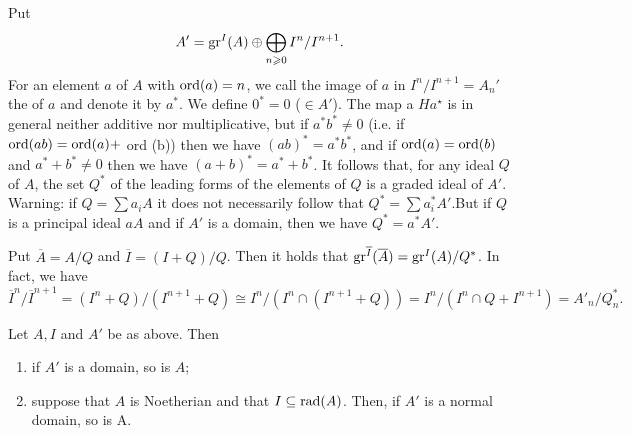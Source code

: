 \documentclass[../main]{subfiles}
\begin{document}
Put \[A'=\operatorname{gr}^I(A) \oplus \bigoplus_{n\geqslant 0} I^n/I^{n+1}.\] For an element $a$ of $A$ with $\operatorname{ord}(a)=n$, we call the image of $a$ in $I^n / I^{n+1}=A_n'$ the  of $a$ and denote it by $a^{\ast}$. We define $0^{\ast}=0$ ($\in A'$). The map a $H a^{\star}$ is in general neither additive nor multiplicative, but if $a^{\ast} b^{\ast} \neq 0$ (i.e. if $\operatorname{ord}(a b)=\operatorname{ord}(a)+$ ord (b)) then we have $(a b)^\ast=a^\ast b^\ast$, and if $\operatorname{ord}(a)=\operatorname{ord}(b)$ and $a^{\ast}+b^{\ast} \neq 0$ then we have $(a+b)^{\ast}=a^{\ast}+b^{\ast}$. It follows that, for any ideal $Q$ of $A$, the set $Q^{\ast}$ of the leading forms of the elements of $Q$ is a graded ideal of $A'$. Warning: if $Q=\sum a_iA$ it does not necessarily follow that $Q^{\ast}=\sum a_i^{\ast} A'$.But if $Q$ is a principal ideal $aA$ and if $A'$ is a domain, then we have $Q^{\ast}=a^{\ast} A'$.

Put $\overline{A} = A/Q$ and $\overline{I}= (I+Q)/Q$. Then it holds that $\operatorname{gr}^{\overline{I}}(\overline{A}) = \operatorname{gr}^I(A)/Q^\ast$. In fact, we have \[\overline{I}^n/\overline{I}^{n+1}=(I^n+Q)/(I^{n+1}+Q)\cong I^n/(I^n\cap (I^{n+1}+Q))= I^n/(I^n\cap Q+ I^{n+1}) = A'_n/Q^\ast_n.\] 


\begin{partheorem}[Krull]\label{thm:034}
 Let $A, I$ and $A'$ be as above. Then
 \begin{enumerate}
     \item if $A'$ is a domain, so is $A$;
     \item suppose that $A$ is Noetherian and that $I \subseteq \operatorname{rad}(A)$. Then, if $A'$ is a normal domain, so is A.
 \end{enumerate}
\end{partheorem}
\end{document}
